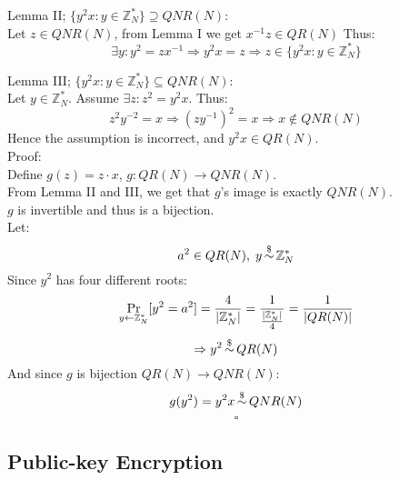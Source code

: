 Lemma II; $\{y^2x:y\in\mathbb{Z}_N^*\}\supseteq QNR(N)$:\\
Let $z\in QNR(N)$, from Lemma I we get $x^{-1}z\in QR(N)$
Thus:
\[
	\exists y: y^2=zx^{-1}
	\Rightarrow y^2x=z
	\Rightarrow z\in\{y^2x:y\in\mathbb{Z}_N^*\}	
\]

Lemma III; $\{y^2x:y\in\mathbb{Z}_N^*\}\subseteq QNR(N)$:\\
Let $y\in\mathbb{Z}_N^*$. Assume $\exists z:z^2=y^2x$.
Thus:
\[
	z^2y^{-2}=x\Rightarrow (zy^{-1})^2=x\Rightarrow x\notin QNR(N)
\]
Hence the assumption is incorrect, and $y^2x\in QR(N)$.\\

Proof:\\
Define $g(z)=z\cdot x$, $g:QR(N)\longrightarrow QNR(N)$.\\
From Lemma II and III, we get that $g$'s image is exactly $QNR(N)$.\\
$g$ is invertible and thus is a bijection.\\
Let:
\[
	a^2\in QR(N),\;y\operatorname*{\sim}^\$\mathbb{Z}_N^*
\]
Since $y^2$ has four different roots:
\[
	\operatorname*{Pr}_{y\leftarrow \mathbb{Z}_N^*}[y^2=a^2]
	=\frac{4}{|\mathbb{Z}_N^*|}
	=\frac{1}{\frac{|\mathbb{Z}_N^*|}{4}}
	=\frac{1}{|QR(N)|}
\]
\[
	\Rightarrow y^2\operatorname*{\sim}^\$QR(N)
\]
And since $g$ is bijection $QR(N)\rightarrow QNR(N)$:
\[
	g(y^2)=y^2x\operatorname*{\sim}^\$ QNR(N)
\]
\[\square\]

\subsection{Public-key Encryption}
